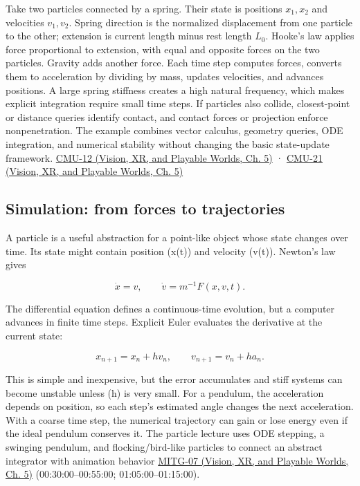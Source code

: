 Take two particles connected by a spring. Their state is positions \(x_1,x_2\) and velocities \(v_1,v_2\). Spring direction is the normalized displacement from one particle to the other; extension is current length minus rest length \(L_0\). Hooke's law applies force proportional to extension, with equal and opposite forces on the two particles. Gravity adds another force. Each time step computes forces, converts them to acceleration by dividing by mass, updates velocities, and advances positions. A large spring stiffness creates a high natural frequency, which makes explicit integration require small time steps. If particles also collide, closest-point or distance queries identify contact, and contact forces or projection enforce nonpenetration. The example combines vector calculus, geometry queries, ODE integration, and numerical stability without changing the basic state-update framework. \href{../07-Vision-XR-and-Playable-Worlds/main.pdf\#nameddest=04-visual-computing-ii-ch036-cmu-12---geometric-queries}{CMU-12 (Vision, XR, and Playable Worlds, Ch. 5)} · \href{../07-Vision-XR-and-Playable-Worlds/main.pdf\#nameddest=04-visual-computing-ii-ch036-cmu-21---dynamics-and-time-integration}{CMU-21 (Vision, XR, and Playable Worlds, Ch. 5)}

\subsection{Simulation: from forces to trajectories}\label{04-visual-computing-ii-ch029-simulation-from-forces-to-trajectories}

A particle is a useful abstraction for a point-like object whose state changes over time. Its state might contain position (x(t)) and velocity (v(t)). Newton's law gives

\[
\dot{x}=v,\qquad \dot{v}=m^{-1}F(x,v,t).
\]

The differential equation defines a continuous-time evolution, but a computer advances in finite time steps. Explicit Euler evaluates the derivative at the current state:

\[
x_{n+1}=x_n+h v_n,\qquad v_{n+1}=v_n+h a_n.
\]

This is simple and inexpensive, but the error accumulates and stiff systems can become unstable unless (h) is very small. For a pendulum, the acceleration depends on position, so each step's estimated angle changes the next acceleration. With a coarse time step, the numerical trajectory can gain or lose energy even if the ideal pendulum conserves it. The particle lecture uses ODE stepping, a swinging pendulum, and flocking/bird-like particles to connect an abstract integrator with animation behavior \href{../07-Vision-XR-and-Playable-Worlds/main.pdf\#nameddest=04-visual-computing-ii-ch036-mitg-07---particle-systems}{MITG-07 (Vision, XR, and Playable Worlds, Ch. 5)} (00:30:00--00:55:00; 01:05:00--01:15:00).

